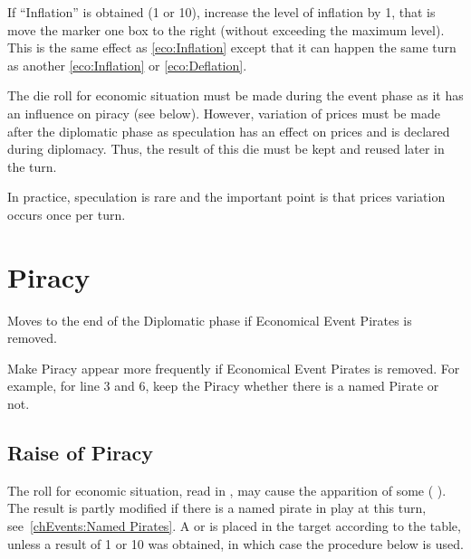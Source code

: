 \aparag[Inflation] \label{chEvents:Inflation}
\bparag If ``Inflation'' is obtained (1 or 10), increase the level of
inflation by 1, that is move the marker one box to the right (without
exceeding the maximum level). This is the same effect as
\ref{eco:Inflation} except that it can happen the same turn as another
\ref{eco:Inflation} or \ref{eco:Deflation}.


\begin{designnote}
  The die roll for economic situation must be made during the event
  phase as it has an influence on piracy (see below). However, variation
  of prices must be made after the diplomatic phase as speculation has
  an effect on prices and is declared during diplomacy. Thus, the result
  of this die must be kept and reused later in the turn.

  In practice, speculation is rare and the important point is that
  prices variation occurs once per turn.
\end{designnote}


\section{Piracy}\label{chEvents:Piracy}

\begin{todo}
  [TBD] Moves to the end of the Diplomatic phase if Economical Event
  Pirates is removed.
\end{todo}

\begin{todo}
  [TBD] Make Piracy appear more frequently if Economical Event Pirates
  is removed. For example, for line 3 and 6, keep the Piracy whether
  there is a named Pirate or not.
\end{todo}


\subsection{Raise of Piracy}

\aparag The roll for economic situation, read in , may cause the apparition of some \PIRATE
( \corsaire). The result is partly modified if there is a
named pirate in play at this turn, see~\ref{chEvents:Named Pirates}.
\bparag A \PIRATE \corsaire\facemoins or \PIRATE \corsaire\faceplus is
placed in the target \STZ according to the table, unless a result of 1
or 10 was obtained, in which case the procedure below is used.

